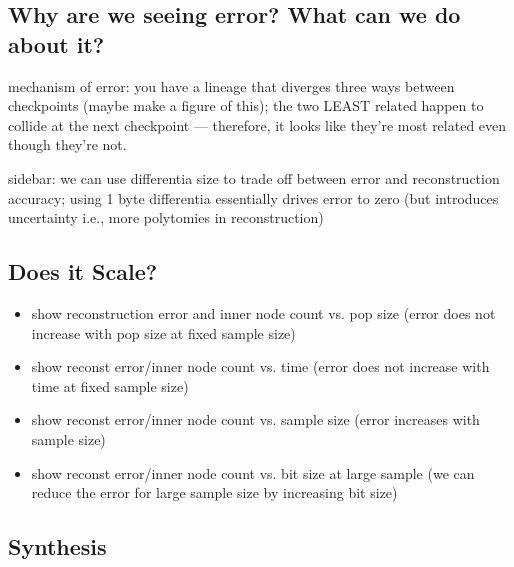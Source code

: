 \subsection{Why are we seeing error? What can we do about it?} \label{sec:error-uncertainty}

mechanism of error: you have a lineage that diverges three ways between checkpoints (maybe make a figure of this); the two LEAST related happen to collide at the next checkpoint --- therefore, it looks like they're most related even though they're not.

sidebar: we can use differentia size to trade off between error and reconstruction accuracy; using 1 byte differentia essentially drives error to zero (but introduces uncertainty i.e., more polytomies in reconstruction)

\subsection{Does it Scale?} \label{sec:scaling}



\begin{itemize}
    \item show reconstruction error and inner node count vs. pop size (error does not increase with pop size at fixed sample size)
    \item show reconst error/inner node count vs. time (error does not increase with time at fixed sample size)
    \item show reconst error/inner node count vs. sample size (error increases with sample size)
    \item show reconst error/inner node count vs. bit size at large sample (we can reduce the error for large sample size by increasing bit size)
\end{itemize}

\subsection{Synthesis} \label{sec:synthesis}

